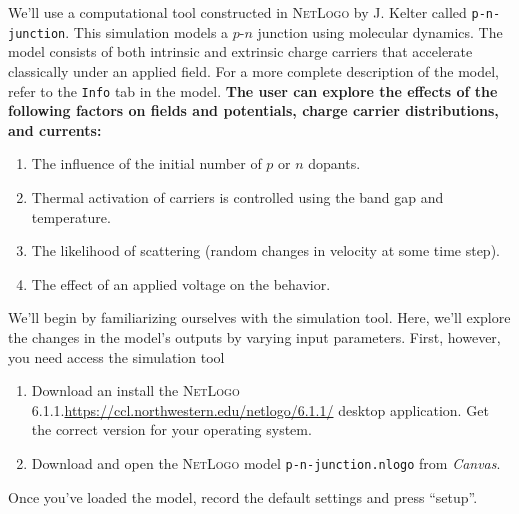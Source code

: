 \documentclass[12pt]{exam}
\begin{document}
We'll use a computational tool constructed in \textsc{NetLogo} by J. Kelter called \texttt{p-n-junction}. This simulation models a $p$-$n$ junction using molecular dynamics. The model consists of both intrinsic and extrinsic charge carriers that accelerate classically under an applied field. For a more complete description of the model, refer to the \texttt{Info} tab in the model. \textbf{The user can explore the effects of the following factors on fields and potentials, charge carrier distributions, and currents:}

\begin{enumerate}
    \item The influence of the initial number of $p$ or $n$ dopants.
    \item Thermal activation of carriers is controlled using the band gap and temperature.
    \item The likelihood of scattering (random changes in velocity at some time step).
    \item The effect of an applied voltage on the behavior.
\end{enumerate}

\newpage


\begin{questions}
\question \textcolor{NUpurp120}{\Large{}} 

We'll begin by familiarizing ourselves with the simulation tool. Here, we'll explore the changes in the model's outputs by varying input parameters. First, however, you need access the simulation tool
    
    \begin{enumerate}
        \item Download an install the \textsc{NetLogo} 6.1.1.\href{https://ccl.northwestern.edu/netlogo/6.1.1/}{https://ccl.northwestern.edu/netlogo/6.1.1/}  desktop application. Get the correct version for your operating system.
        \item Download and open the \textsc{NetLogo} model \texttt{p-n-junction.nlogo} from \textit{Canvas}.
    \end{enumerate} 
    
Once you've loaded the model, record the default settings and press ``setup''.



\end{questions}
\end{document}
